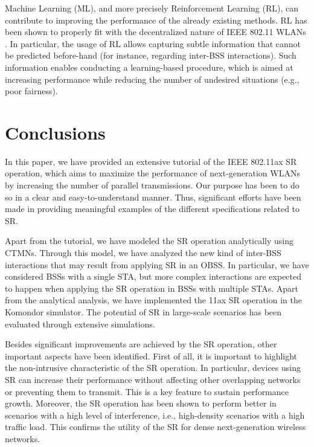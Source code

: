\documentclass{ieeeaccess}
\begin{document}
Machine Learning (ML), and more precisely Reinforcement Learning (RL), can contribute to improving the performance of the already existing methods. RL has been shown to properly fit with the decentralized nature of IEEE 802.11 WLANs \cite{wilhelmi2019collaborative, wilhelmi2019potential}. In particular, the usage of RL allows capturing subtle information that cannot be predicted before-hand (for instance, regarding inter-BSS interactions). Such information enables conducting a learning-based procedure, which is aimed at increasing performance while reducing the number of undesired situations (e.g., poor fairness).

\section{Conclusions}
\label{section:conclusions}
In this paper, we have provided an extensive tutorial of the IEEE 802.11ax SR operation, which aims to maximize the performance of next-generation WLANs by increasing the number of parallel transmissions. Our purpose has been to do so in a clear and easy-to-understand manner. Thus, significant efforts have been made in providing meaningful examples of the different specifications related to SR. %

Apart from the tutorial, we have modeled the SR operation analytically using CTMNs. Through this model, we have analyzed the new kind of inter-BSS interactions that may result from applying SR in an OBSS. In particular, we have considered BSSs with a single STA, but more complex interactions are expected to happen when applying the SR operation in BSSs with multiple STAs. Apart from the analytical analysis, we have implemented the 11ax SR operation in the Komondor simulator. The potential of SR in large-scale scenarios has been evaluated through extensive simulations.

Besides significant improvements are achieved by the SR operation, other important aspects have been identified. First of all, it is important to highlight the non-intrusive characteristic of the SR operation. In particular, devices using SR can increase their performance without affecting other overlapping networks or preventing them to transmit. This is a key feature to sustain performance growth. Moreover, the SR operation has been shown to perform better in scenarios with a high level of interference, i.e., high-density scenarios with a high traffic load. This confirms the utility of the SR for dense next-generation wireless networks.
\end{document}
